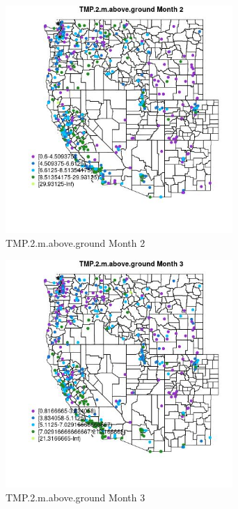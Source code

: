 \begin{figure} 
\centering  
\includegraphics[width=0.77\textwidth]{Code_Outputs/ML_input_report_ML_input_PM25_Step5_part_d_de_duplicated_aves_ML_input_MapObsMo2TMP2maboveground.jpg} 
\caption{\label{fig:ML_input_report_ML_input_PM25_Step5_part_d_de_duplicated_aves_ML_inputMapObsMo2TMP2maboveground}TMP.2.m.above.ground Month 2} 
\end{figure} 
 

\begin{figure} 
\centering  
\includegraphics[width=0.77\textwidth]{Code_Outputs/ML_input_report_ML_input_PM25_Step5_part_d_de_duplicated_aves_ML_input_MapObsMo3TMP2maboveground.jpg} 
\caption{\label{fig:ML_input_report_ML_input_PM25_Step5_part_d_de_duplicated_aves_ML_inputMapObsMo3TMP2maboveground}TMP.2.m.above.ground Month 3} 
\end{figure} 
 

